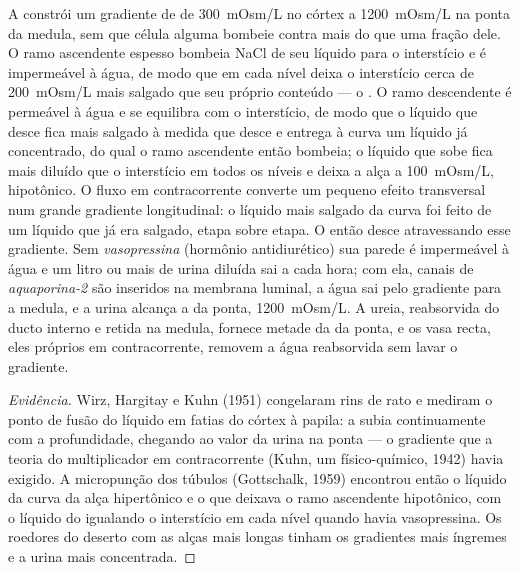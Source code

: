 \begin{proposition}\label{prop:b3:renal-osmoregulation:countercurrent}
A  constrói um gradiente de  de
\qty{300}{mOsm/L} no córtex a \qty{1200}{mOsm/L} na ponta da medula, sem
que célula alguma bombeie contra mais do que uma fração dele. O ramo
ascendente espesso bombeia NaCl de seu líquido para o interstício e é
impermeável à água, de modo que em cada nível deixa o interstício cerca
de \qty{200}{mOsm/L} mais salgado que seu próprio conteúdo --- o
\emph{}. O ramo descendente é permeável à água e se
equilibra com o interstício, de modo que o líquido que desce fica mais
salgado à medida que desce e entrega à curva um líquido já concentrado,
do qual o ramo ascendente então bombeia; o líquido que sobe fica mais
diluído que o interstício em todos os níveis e deixa a alça a
\qty{100}{mOsm/L}, hipotônico. O fluxo em contracorrente converte um
pequeno efeito transversal num grande gradiente longitudinal: o líquido
mais salgado da curva foi feito de um líquido que já era salgado, etapa
sobre etapa. O  então desce atravessando esse gradiente. Sem
\emph{vasopressina} (hormônio antidiurético) sua parede é impermeável à
água e um litro ou mais de urina diluída sai a cada hora; com ela, canais
de \emph{aquaporina-2} são inseridos na membrana luminal, a água sai pelo
gradiente para a medula, e a urina alcança a  da ponta,
\qty{1200}{mOsm/L}. A ureia, reabsorvida do ducto interno e retida na
medula, fornece metade da  da ponta, e os vasa recta, eles
próprios em contracorrente, removem a água reabsorvida sem lavar o
gradiente.
\end{proposition}

\begin{proof}[Evidência]
Wirz, Hargitay e Kuhn (1951) congelaram rins de rato e mediram o ponto
de fusão do líquido em fatias do córtex à papila: a  subia
continuamente com a profundidade, chegando ao valor da urina na ponta
--- o gradiente que a teoria do multiplicador em contracorrente (Kuhn,
um físico-químico, 1942) havia exigido. A micropunção dos túbulos
(Gottschalk, 1959) encontrou então o líquido da curva da alça hipertônico
e o que deixava o ramo ascendente hipotônico, com o líquido do  igualando o interstício em cada nível quando havia vasopressina.
Os roedores do deserto com as alças mais longas tinham os gradientes mais
íngremes e a urina mais concentrada.
\end{proof}


